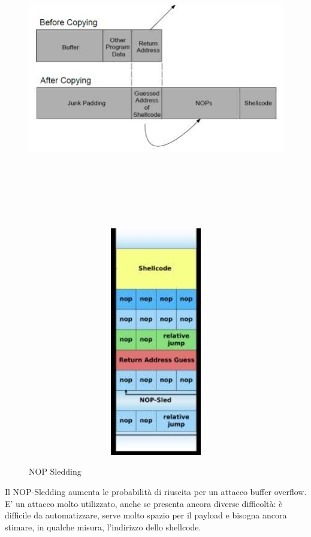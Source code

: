 \begin{figure}[htbp]
	\centering%
	\subfigure%
	{\includegraphics[height=13cm, width=13cm, keepaspectratio]{Immagini/sistemi_operativi/nop_sledding.png}}
	{\includegraphics[height=10cm, width=13cm, keepaspectratio]{Immagini/sistemi_operativi/nop_sledding_2.png}}
	\caption{NOP Sledding\label{fig:nop_sledding}} 	
\end{figure}
Il NOP-Sledding aumenta le probabilità di riuscita per un attacco buffer overflow. E' un attacco molto utilizzato, anche se presenta ancora diverse difficoltà: è difficile da automatizzare, serve molto spazio per il payload e bisogna ancora stimare, in qualche misura, l'indirizzo dello shellcode.
